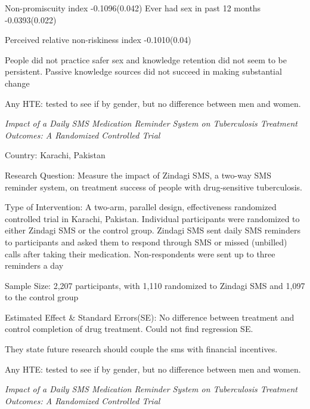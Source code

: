 \documentclass{article}
\begin{document}
Non-promiscuity index -0.1096(0.042)
Ever had sex in past 12 months -0.0393(0.022)

Perceived relative non-riskiness index -0.1010(0.04)


\hfill
People did not practice safer sex and knowledge retention did not seem to be persistent. Passive knowledge sources did not succeed in making substantial change



\hfill

Any HTE: tested to see if by gender, but no difference between men and women.

\textit{Impact of a Daily SMS Medication Reminder System on Tuberculosis Treatment Outcomes: A Randomized Controlled Trial
}



\hfill

Country: Karachi, Pakistan

\hfill

Research Question:
Measure the impact of Zindagi SMS, a two-way SMS reminder system, on treatment success of people with drug-sensitive tuberculosis.

\hfill

Type of Intervention: A two-arm, parallel design, effectiveness randomized controlled trial in Karachi, Pakistan. Individual participants were randomized to either Zindagi SMS or the control group. Zindagi SMS sent daily SMS reminders to participants and asked them to respond through SMS or missed (unbilled) calls after taking their medication. Non-respondents were sent up to three reminders a day

\hfill

Sample Size:  2,207 participants, with 1,110 randomized to Zindagi SMS and 1,097 to the control group
\hfill

Estimated Effect \& Standard Errors(SE): 
No difference between treatment and control completion of drug treatment. Could not find regression SE.



\hfill
They state future research should couple the sms with financial incentives.


\hfill

Any HTE: tested to see if by gender, but no difference between men and women.


\textit{Impact of a Daily SMS Medication Reminder System on Tuberculosis Treatment Outcomes: A Randomized Controlled Trial
}
\end{document}
